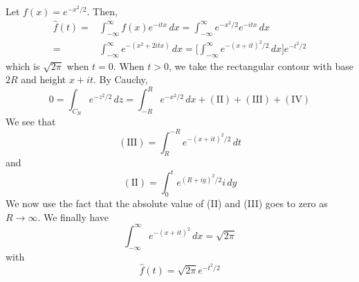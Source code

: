 \vspace{2ex}
\begin{ex}
Let $f(x)=e^{-x^2/2}$. Then, 
\[\begin{align*}
\hat{f}(t)=&\int ^{\infty }_{-\infty }f(x)e^{-itx}\,dx=\int ^{\infty }_{-\infty }e^{-x^2/2}e^{-itx}\,dx\\
=&\int ^{\infty }_{-\infty }e^{-(x^2+2itx)}\,dx=\Big[\int ^{\infty }_{-\infty }e^{-(x+it)^2/2}\,dx\Big]e^{-t^2/2}
\end{align*}\]
which is $\sqrt{2\pi }$ when $t=0$. When $t>0$, we take the rectangular contour with base $2R$ and height $x+it$. By Cauchy,
\[0=\int _{C_{R}}e^{-z^2/2}\,dz=\int ^{R}_{-R}e^{-x^2/2}\,dx+\mathrm{(II)}+\mathrm{(III)}+\mathrm{(IV)}\]
We see that
\[\mathrm{(III)}=\int ^{-R}_{R}e^{-(x+it)^2/2}\,dt\]
and
\[\mathrm{(II)}=\int ^{t}_{0}e^{(R+iy)^2/2}i\,dy\]
We now use the fact that the absolute value of (II) and (III) goes to zero as $R\rightarrow \infty $. We finally have
\[\int ^{\infty }_{-\infty }e^{-(x+it)^2}\,dx=\sqrt{2\pi }\]
with
\[\hat{f}(t)=\sqrt{2\pi }e^{-t^2/2}\]
\end{ex}
\vspace{2ex}

